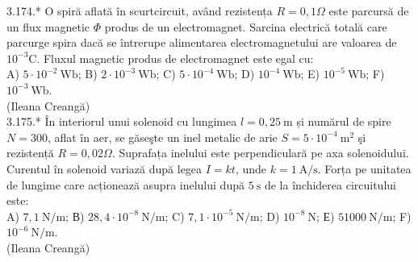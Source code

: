 \documentclass[10pt]{article}
\begin{document}
3.174.* O spiră aflată în scurtcircuit, având rezistența $R=0,1 \Omega$ este parcursă de un flux magnetic $\Phi$ produs de un electromagnet. Sarcina electrică totală care parcurge spira dacă se întrerupe alimentarea electromagnetului are valoarea de $10^{-3} \mathrm{C}$. Fluxul magnetic produs de electromagnet este egal cu:\\ A) $5 \cdot 10^{-2} \mathrm{~Wb}$; B) $2 \cdot 10^{-3} \mathrm{~Wb}$; C) $5 \cdot 10^{-4} \mathrm{~Wb}$; D) $10^{-4} \mathrm{~Wb}$; E) $10^{-5} \mathrm{~Wb}$; F) $10^{-3} \mathrm{~Wb}$.\\ (Ileana Creangă)\\

3.175.* În interiorul unui solenoid cu lungimea $l=0,25 \mathrm{~m}$ și numărul de spire $N=300$, aflat în aer, se găseşte un inel metalic de arie $S=5 \cdot 10^{-4} \mathrm{~m}^{2}$ şi rezistență $R=0,02 \Omega$. Suprafața inelului este perpendiculară pe axa solenoidului. Curentul în solenoid variază după legea $I=k t$, unde $k=1 \mathrm{~A} / \mathrm{s}$. Forța pe unitatea de lungime care acționează asupra inelului după $5 \mathrm{~s}$ de la închiderea circuitului este:\\ A) $7,1 \mathrm{~N} / \mathrm{m}$; В) $28,4 \cdot 10^{-8} \mathrm{~N} / \mathrm{m}$; C) $7,1 \cdot 10^{-5} \mathrm{~N} / \mathrm{m}$; D) $10^{-8} \mathrm{~N}$; Е) $51000 \mathrm{~N} / \mathrm{m}$; F) $10^{-6} \mathrm{~N} / \mathrm{m}$.\\ (Ileana Creangă)\\
\end{document}
